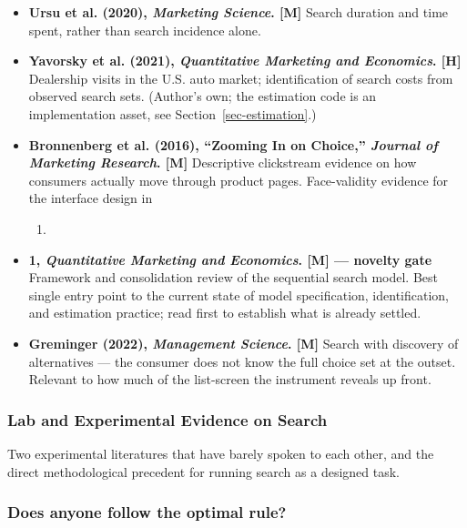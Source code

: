 \documentclass[
  letterpaper,
  DIV=11,
  numbers=noendperiod]{scrartcl}
\providecommand{\tightlist}{%
  \setlength{\itemsep}{0pt}\setlength{\parskip}{0pt}}
\begin{document}
\begin{itemize}
  is direct: here the same variation is free, designed in, and present
  in every task.
\item
  \textbf{Ursu et al. (2020), \emph{Marketing Science}. {[}M{]}} Search
  duration and time spent, rather than search incidence alone.
\item
  \textbf{Yavorsky et al. (2021), \emph{Quantitative Marketing and
  Economics}. {[}H{]}} Dealership visits in the U.S. auto market;
  identification of search costs from observed search sets. (Author's
  own; the estimation code is an implementation asset, see
  Section~\ref{sec-estimation}.)
\item
  \textbf{Bronnenberg et al. (2016), ``Zooming In on Choice,''
  \emph{Journal of Marketing Research}. {[}M{]}} Descriptive clickstream
  evidence on how consumers actually move through product pages.
  Face-validity evidence for the interface design in

  \begin{enumerate}
  \def\labelenumi{\arabic{enumi}.}
  \setcounter{enumi}{1}
  \tightlist
  \item
  \end{enumerate}
\item
  \textbf{1, \emph{Quantitative Marketing and Economics}. {[}M{]} ---
  novelty gate} Framework and consolidation review of the sequential
  search model. Best single entry point to the current state of model
  specification, identification, and estimation practice; read first to
  establish what is already settled.
\item
  \textbf{Greminger (2022), \emph{Management Science}. {[}M{]}} Search
  with discovery of alternatives --- the consumer does not know the full
  choice set at the outset. Relevant to how much of the list-screen the
  instrument reveals up front.
\end{itemize}

\subsubsection{Lab and Experimental Evidence on
Search}\label{sec-applit-lab}

Two experimental literatures that have barely spoken to each other, and
the direct methodological precedent for running search as a designed
task.

\subsubsection{Does anyone follow the optimal
rule?}\label{does-anyone-follow-the-optimal-rule}
\end{document}
